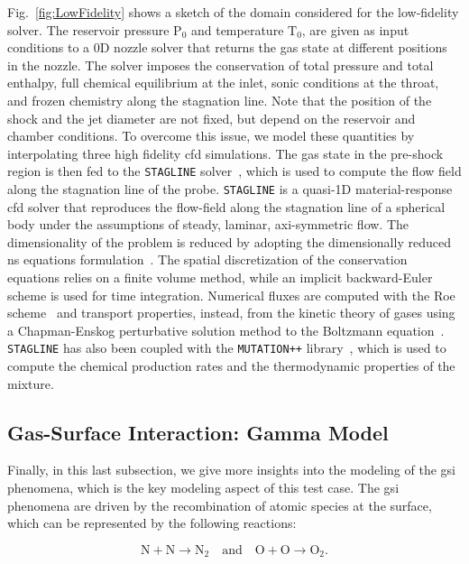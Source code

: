 Fig.~\ref{fig:LowFidelity} shows a sketch of the domain considered for the low-fidelity solver. The reservoir pressure $\mathrm{P}_0$ and temperature $\mathrm{T}_0$, are given as input conditions to a 0D nozzle solver that returns the gas state at different positions in the nozzle. The solver imposes the conservation of total pressure and total enthalpy, full chemical equilibrium at the inlet, sonic conditions at the throat, and frozen chemistry along the stagnation line. Note that the position of the shock and the jet diameter are not fixed, but depend on the reservoir and chamber conditions. To overcome this issue, we model these quantities by interpolating three high fidelity \gls{cfd} simulations. The gas state in the pre-shock region is then fed to the \texttt{STAGLINE} solver~\cite{STAGLINE}, which is used to compute the flow field along the stagnation line of the probe. \texttt{STAGLINE} is a quasi-1D material-response \gls{cfd} solver that reproduces the flow-field along the stagnation line of a spherical body under the assumptions of steady, laminar, axi-symmetric flow. The dimensionality of the problem is reduced by adopting the dimensionally reduced \gls{ns} equations formulation~\cite{DRNSE}. The spatial discretization of the conservation equations relies on a finite volume method, while an implicit backward-Euler scheme is used for time integration. Numerical fluxes are computed with the Roe scheme~\cite{ROEscheme} and transport properties, instead, from the kinetic theory of gases using a Chapman-Enskog perturbative solution method to the Boltzmann equation~\cite{MAGIN_Transport_Properties}. \texttt{STAGLINE} has also been coupled with the \texttt{MUTATION++} library~\cite{MUTATIONPP}, which is used to compute the chemical production rates and the thermodynamic properties of the mixture.

\subsection{Gas-Surface Interaction: Gamma Model}
\label{subsubsec:GSI}

Finally, in this last subsection, we give more insights into the modeling of the \gls{gsi} phenomena, which is the key modeling aspect of this test case. 
The \gls{gsi} phenomena are driven by the recombination of atomic species at the surface, which can be represented by the following reactions:

\begin{equation}
    \text{N} + \text{N} \rightarrow \text{N}_2 \quad \text{and} \quad \text{O} + \text{O} \rightarrow \text{O}_2.
\end{equation}

